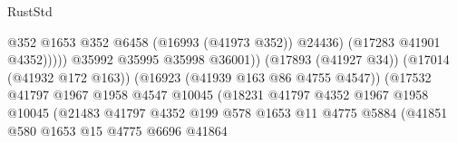 \begin{lexlean}{RustStd}
\begin{coremodule}
                                                              @352
                                                              @1653
                                                              @352
                                                              @6458
                                                              (@16993 (@41973 @352))
                                                              @24436)
                                                            (@17283 @41901 @4352)))))
                                                    @35992
                                                    @35995
                                                    @35998
                                                    @36001))
                                                (@17893 (@41927 @34))
                                                (@17014 (@41932 @172 @163))
                                                (@16923 (@41939 @163 @86 @4755 @4547))
                                                (@17532
                                                  @41797
                                                  @1967
                                                  @1958
                                                  @4547
                                                  @10045
                                                  (@18231
                                                    @41797
                                                    @4352
                                                    @1967
                                                    @1958
                                                    @10045
                                                    (@21483
                                                      @41797
                                                      @4352
                                                      @199
                                                      @578
                                                      @1653
                                                      @11
                                                      @4775
                                                      @5884
                                                      (@41851
                                                        @580
                                                        @1653
                                                        @15
                                                        @4775
                                                        @6696
                                                        @41864

\end{coremodule}
\end{lexlean}
